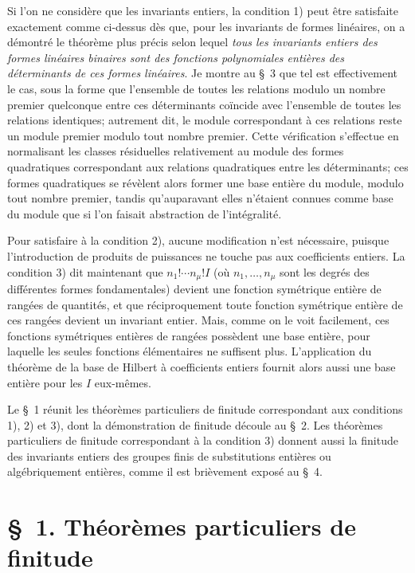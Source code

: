Si l'on ne considère que les invariants entiers, la condition 1) peut être satisfaite exactement comme ci-dessus dès que, pour les invariants de formes linéaires, on a démontré le théorème plus précis selon lequel \emph{tous les invariants entiers des formes linéaires binaires sont des fonctions polynomiales entières des déterminants de ces formes linéaires}. Je montre au \S\ 3 que tel est effectivement le cas, sous la forme que l'ensemble de toutes les relations modulo un nombre premier quelconque entre ces déterminants coïncide avec l'ensemble de toutes les relations identiques; autrement dit, le module correspondant à ces relations reste un module premier modulo tout nombre premier. Cette vérification s'effectue en normalisant les classes résiduelles relativement au module des formes quadratiques correspondant aux relations quadratiques entre les déterminants; ces formes quadratiques se révèlent alors former une base entière du module, modulo tout nombre premier, tandis qu'auparavant elles n'étaient connues comme base du module que si l'on faisait abstraction de l'intégralité.

Pour satisfaire à la condition 2), aucune modification n'est nécessaire, puisque l'introduction de produits de puissances ne touche pas aux coefficients entiers. La condition 3) dit maintenant que $n_1!\cdots n_\mu! I$ (où $n_1,\ldots,n_\mu$ sont les degrés des différentes formes fondamentales) devient une fonction symétrique entière de rangées de quantités, et que réciproquement toute fonction symétrique entière de ces rangées devient un invariant entier. Mais, comme on le voit facilement, ces fonctions symétriques entières de rangées possèdent une base entière, pour laquelle les seules fonctions élémentaires ne suffisent plus. L'application du théorème de la base de Hilbert à coefficients entiers fournit alors aussi une base entière pour les $I$ eux-mêmes.

Le \S\ 1 réunit les théorèmes particuliers de finitude correspondant aux conditions 1), 2) et 3), dont la démonstration de finitude découle au \S\ 2. Les théorèmes particuliers de finitude correspondant à la condition 3) donnent aussi la finitude des invariants entiers des groupes finis de substitutions entières ou algébriquement entières, comme il est brièvement exposé au \S\ 4.

\section*{\S\ 1. Théorèmes particuliers de finitude}

